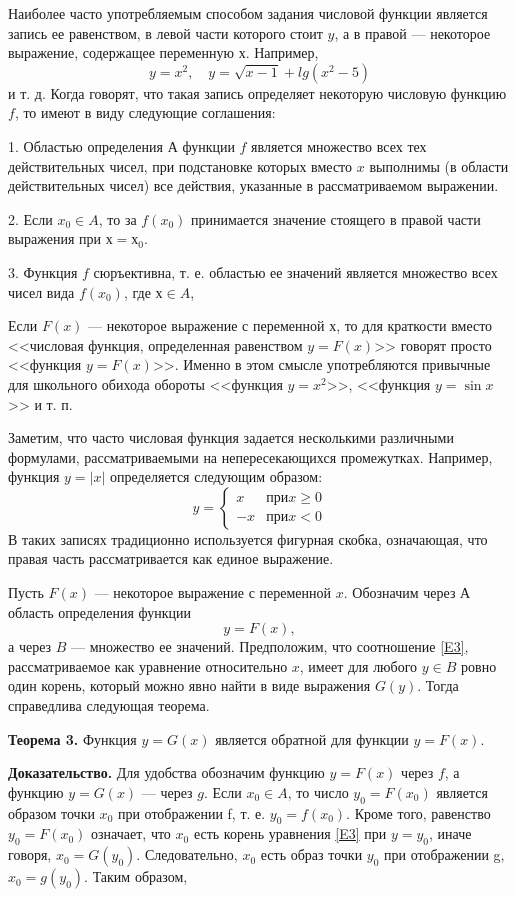 \documentclass{article}
\begin{document}
\par Наиболее часто употребляемым способом задания числовой функции является запись ее равенством, в левой части которого стоит $y$, а в правой — некоторое выражение, содержащее переменную $х$. Например,
$$y=x^2,\quad y=\sqrt{x-1}+lg(x^2-5)$$
и т. д. Когда говорят, что такая запись определяет некоторую числовую функцию $f$, то имеют в виду следующие соглашения:
\par 1.	Областью определения $А$ функции $f$ является множество всех тех действительных чисел, при подстановке которых вместо $x$ выполнимы (в области действительных чисел) все действия, указанные в рассматриваемом выражении.
\par 2. Если $x_0\in A$, то за $f(x_0)$ принимается значение стоящего в правой части выражения при $х=х_0$.
\par 3.	Функция $f$ сюръективна, т. е. областью ее значений является множество всех чисел вида $f(x_0)$, где $х\in A$,
\par Если $F(x)$ — некоторое выражение с переменной $х$, то для краткости вместо <<числовая функция, определенная равенством $y=F(x)$>> говорят просто <<функция $y=F(x)$>>. Именно в этом смысле употребляются привычные для школьного обихода обороты <<функция $y=x^2$>>, <<функция $y=\sin x$>> и т. п.
\par Заметим, что часто числовая функция задается несколькими различными формулами, рассматриваемыми на непересекающихся промежутках. Например, функция $y=|x|$ определяется следующим образом:
$$y=
\begin{cases}
x&\text{при} x\ge 0\\
-x&\text{при} x<0
\end{cases}
$$
В таких записях традиционно используется фигурная скобка, означающая, что правая часть рассматривается как единое выражение.
\par Пусть $F(x)$ — некоторое выражение с переменной $x$. Обозначим через $А$ область определения функции
\begin{equation}\label{E3}
y=F(x),
\end{equation}
а через $B$ — множество ее значений. Предположим, что соотношение \eqref{E3}, рассматриваемое как уравнение относительно $x$, имеет для любого $y\in B$ ровно один корень, который можно явно найти в виде выражения $G(y)$. Тогда справедлива следующая теорема.
\par\textbf{Теорема 3.}  Функция $y=G(x)$ является обратной для функции $y=F(x)$.
\par \textbf{Доказательство.} Для удобства обозначим функцию $y=F(x)$ через $f$, а функцию $y=G(x)$ — через $g$. Если $x_0\in A$, то число $y_0=F(x_0)$ является образом точки $x_0$ при отображении f, т. е. $y_0=f(x_0).$ Кроме того, равенство $y_0=F(x_0)$ означает, что $x_0$ есть корень уравнения \eqref{E3} при $y=y_0$, иначе говоря, $x_0=G(y_0).$ Следовательно, $x_0$ есть образ точки $y_0$ при отображении g, $x_0=g(y_0).$ Таким образом,
\end{document}
